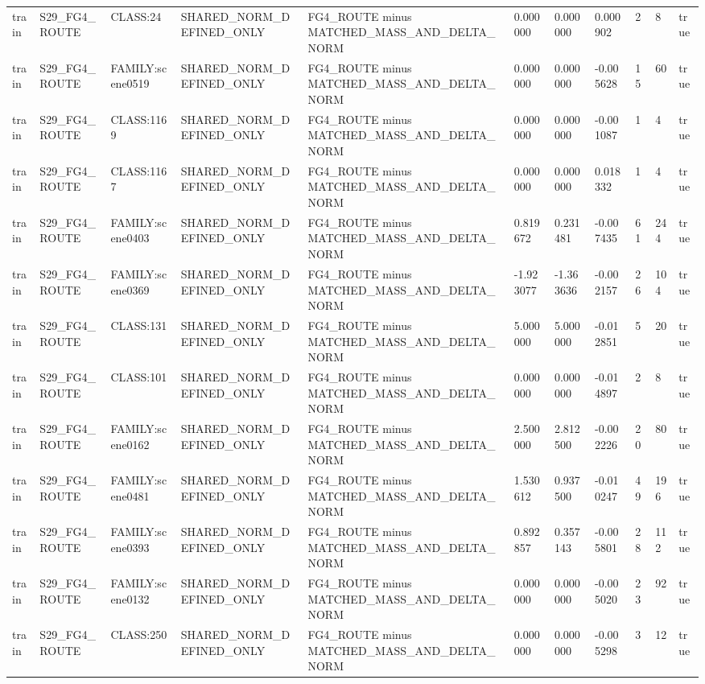 \begin{tabular}{lllllllllll}
train & S29\_FG4\_ROUTE & CLASS:24 & SHARED\_NORM\_DEFINED\_ONLY & FG4\_ROUTE minus MATCHED\_MASS\_AND\_DELTA\_NORM & 0.000000 & 0.000000 & 0.000902 & 2 & 8 & true \\
train & S29\_FG4\_ROUTE & FAMILY:scene0519 & SHARED\_NORM\_DEFINED\_ONLY & FG4\_ROUTE minus MATCHED\_MASS\_AND\_DELTA\_NORM & 0.000000 & 0.000000 & -0.005628 & 15 & 60 & true \\
train & S29\_FG4\_ROUTE & CLASS:1169 & SHARED\_NORM\_DEFINED\_ONLY & FG4\_ROUTE minus MATCHED\_MASS\_AND\_DELTA\_NORM & 0.000000 & 0.000000 & -0.001087 & 1 & 4 & true \\
train & S29\_FG4\_ROUTE & CLASS:1167 & SHARED\_NORM\_DEFINED\_ONLY & FG4\_ROUTE minus MATCHED\_MASS\_AND\_DELTA\_NORM & 0.000000 & 0.000000 & 0.018332 & 1 & 4 & true \\
train & S29\_FG4\_ROUTE & FAMILY:scene0403 & SHARED\_NORM\_DEFINED\_ONLY & FG4\_ROUTE minus MATCHED\_MASS\_AND\_DELTA\_NORM & 0.819672 & 0.231481 & -0.007435 & 61 & 244 & true \\
train & S29\_FG4\_ROUTE & FAMILY:scene0369 & SHARED\_NORM\_DEFINED\_ONLY & FG4\_ROUTE minus MATCHED\_MASS\_AND\_DELTA\_NORM & -1.923077 & -1.363636 & -0.002157 & 26 & 104 & true \\
train & S29\_FG4\_ROUTE & CLASS:131 & SHARED\_NORM\_DEFINED\_ONLY & FG4\_ROUTE minus MATCHED\_MASS\_AND\_DELTA\_NORM & 5.000000 & 5.000000 & -0.012851 & 5 & 20 & true \\
train & S29\_FG4\_ROUTE & CLASS:101 & SHARED\_NORM\_DEFINED\_ONLY & FG4\_ROUTE minus MATCHED\_MASS\_AND\_DELTA\_NORM & 0.000000 & 0.000000 & -0.014897 & 2 & 8 & true \\
train & S29\_FG4\_ROUTE & FAMILY:scene0162 & SHARED\_NORM\_DEFINED\_ONLY & FG4\_ROUTE minus MATCHED\_MASS\_AND\_DELTA\_NORM & 2.500000 & 2.812500 & -0.002226 & 20 & 80 & true \\
train & S29\_FG4\_ROUTE & FAMILY:scene0481 & SHARED\_NORM\_DEFINED\_ONLY & FG4\_ROUTE minus MATCHED\_MASS\_AND\_DELTA\_NORM & 1.530612 & 0.937500 & -0.010247 & 49 & 196 & true \\
train & S29\_FG4\_ROUTE & FAMILY:scene0393 & SHARED\_NORM\_DEFINED\_ONLY & FG4\_ROUTE minus MATCHED\_MASS\_AND\_DELTA\_NORM & 0.892857 & 0.357143 & -0.005801 & 28 & 112 & true \\
train & S29\_FG4\_ROUTE & FAMILY:scene0132 & SHARED\_NORM\_DEFINED\_ONLY & FG4\_ROUTE minus MATCHED\_MASS\_AND\_DELTA\_NORM & 0.000000 & 0.000000 & -0.005020 & 23 & 92 & true \\
train & S29\_FG4\_ROUTE & CLASS:250 & SHARED\_NORM\_DEFINED\_ONLY & FG4\_ROUTE minus MATCHED\_MASS\_AND\_DELTA\_NORM & 0.000000 & 0.000000 & -0.005298 & 3 & 12 & true \\

\end{tabular}

